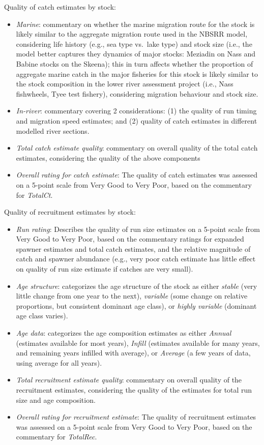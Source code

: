 \documentclass[french,11pt]{book}
\begin{document}
Quality of catch estimates by stock:
\begin{itemize}

\item
  \emph{Marine}: commentary on whether the marine migration route for the stock is likely similar to the aggregate migration route used in the NBSRR model, considering life history (e.g., sea type vs.~lake type) and stock size (i.e., the model better captures they dynamics of major stocks: Meziadin on Nass and Babine stocks on the Skeena); this in turn affects whether the proportion of aggregate marine catch in the major fisheries for this stock is likely similar to the stock composition in the lower river assessment project (i.e., Nass fishwheels, Tyee test fishery), considering migration behaviour and stock size.
\item
  \emph{In-river}: commentary covering 2 considerations: (1) the quality of run timing and migration speed estimates; and (2) quality of catch estimates in different modelled river sections.
\item
  \emph{Total catch estimate quality}: commentary on overall quality of the total catch estimates, considering the quality of the above components
\item
  \emph{Overall rating for catch estimate}: The quality of catch estimates was assessed on a 5-point scale from Very Good to Very Poor, based on the commentary for \emph{TotalCt}.
\end{itemize}
Quality of recruitment estimates by stock:
\begin{itemize}

\item
  \emph{Run rating}: Describes the quality of run size estimates on a 5-point scale from Very Good to Very Poor, based on the commentary ratings for expanded spawner estimates and total catch estimates, and the relative magnitude of catch and spawner abundance (e.g., very poor catch estimate has little effect on quality of run size estimate if catches are very small).
\item
  \emph{Age structure}: categorizes the age structure of the stock as either \emph{stable} (very little change from one year to the next), \emph{variable} (some change on relative proportions, but consistent dominant age class), or \emph{highly variable} (dominant age class varies).
\item
  \emph{Age data}: categorizes the age composition estimates as either \emph{Annual} (estimates available for most years), \emph{Infill} (estimates available for many years, and remaining years infilled with average), or \emph{Average} (a few years of data, using average for all years).
\item
  \emph{Total recruitment estimate quality}: commentary on overall quality of the recruitment estimates, considering the quality of the estimates for total run size and age composition.
\item
  \emph{Overall rating for recruitment estimate}: The quality of recruitment estimates was assessed on a 5-point scale from Very Good to Very Poor, based on the commentary for \emph{TotalRec}.
\end{itemize}
\end{document}
